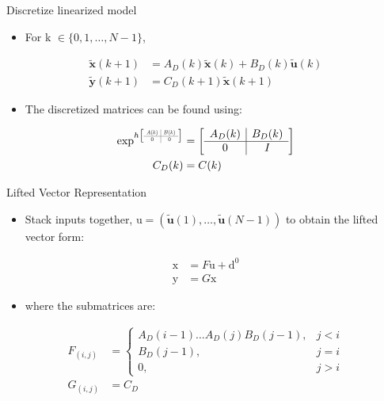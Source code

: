 \documentclass[handout]{beamer}
\newcommand{\state}{\mathbf{x}} %
\newcommand{\sysInput}{\mathbf{u}} %
\newcommand{\observations}{\mathbf{y}} %
\newcommand{\liftedinput}{\mathrm{u}}
\newcommand{\liftedstate}{\mathrm{x}}
\newcommand{\liftedobs}{\mathrm{y}}
\newcommand{\disturbance}{\mathrm{d}}
\newcommand\scalemath[2]{\scalebox{#1}{\mbox{\ensuremath{\displaystyle #2}}}} %
\begin{document}
\begin{frame}{Discretize linearized model}
\begin{itemize}
\item For k $\in \{ 0, 1, \ldots, N-1 \}$, \pause
\end{itemize}
\begin{equation*}
\begin{aligned}
\tilde{\state}(k+1) &= A_{D}(k)\tilde{\state}(k) + B_{D}(k)\tilde{\sysInput}(k) \\
\tilde{\observations}(k+1) &= C_{D}(k+1)\tilde{\state}(k+1)
\end{aligned}
\end{equation*}
\pause
\begin{itemize}
\item The discretized matrices can be found using: \pause
\linebreak
\end{itemize}
\begin{equation*}
\begin{aligned}
\exp^{h
\left[
\scalemath{0.5}{
\begin{array}{c|c}
A(k) & B(k) \\ \hline
0 & 0
\end{array}}\right]}
&= 
\left[
\begin{array}{c|c}
A_{D}(k) & B_{D}(k) \\ \hline
0 & I
\end{array}\right] \\
C_{D}(k) &= C(k)
\end{aligned}
\end{equation*}
\end{frame}
%
\begin{frame}{Lifted Vector Representation}
\begin{itemize}
\item Stack inputs together, $\liftedinput = (\tilde{\sysInput}(1), \ldots, \tilde{\sysInput}(N-1))$ to obtain the lifted vector form: \pause
\end{itemize}
\begin{equation*}
\begin{aligned}
\liftedstate &= F\liftedinput + \disturbance^{0} \\
\liftedobs &= G\liftedstate  
\end{aligned}
\end{equation*}
\pause
\begin{itemize}
\item where the submatrices are: \pause
\linebreak
\end{itemize}
\begin{equation*}
\begin{aligned}
F_{(i,j)} &= \left \{
\begin{array}{cc}
A_{D}(i-1)\ldots A_{D}(j)B_{D}(j-1), & j < i \\ 
B_{D}(j-1), & j = i \\
0, & j > i 
\end{array} \right. \\
G_{(i,j)} &= C_{D}
\end{aligned}
\end{equation*}
\end{frame}
\end{document}

